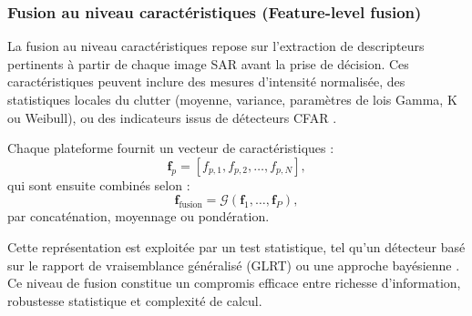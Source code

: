 
\subsubsection{Fusion au niveau caractéristiques (Feature-level fusion)}

La fusion au niveau caractéristiques repose sur l’extraction de descripteurs pertinents à partir de chaque image SAR avant la prise de décision.  
Ces caractéristiques peuvent inclure des mesures d’intensité normalisée, des statistiques locales du clutter (moyenne, variance, paramètres de lois Gamma, K ou Weibull), ou des indicateurs issus de détecteurs CFAR \cite{tison2004}.

Chaque plateforme fournit un vecteur de caractéristiques :
\begin{equation}
\mathbf{f}_p = [f_{p,1}, f_{p,2}, \dots, f_{p,N}],
\end{equation}
qui sont ensuite combinés selon :
\begin{equation}
\mathbf{f}_{\text{fusion}} = \mathcal{G}(\mathbf{f}_1, \dots, \mathbf{f}_P),
\end{equation}
par concaténation, moyennage ou pondération.

Cette représentation est exploitée par un test statistique, tel qu’un détecteur basé sur le rapport de vraisemblance généralisé (GLRT) ou une approche bayésienne \cite{poor1994}.  
Ce niveau de fusion constitue un compromis efficace entre richesse d’information, robustesse statistique et complexité de calcul.



